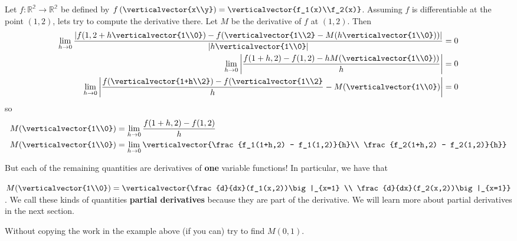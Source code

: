 \documentclass{ximera}
\begin{document}
\begin{example}
	Let $f:\mathbb{R^2} \to \mathbb{R^2}$ be defined by $f\left(\verticalvector{x\\y}\right) = \verticalvector{f_1(x)\\f_2(x)}$. 
	 Assuming $f$ is differentiable at the point $(1,2)$, lets try to compute the derivative there. 
	 Let $M$ be the derivative of $f$ at $(1,2)$.  Then 
	 \begin{align*}\displaystyle\lim_{h \to 0} \frac{\left|f(1,2+h\verticalvector{1\\0}) - f(\verticalvector{1\\2} - M(h\verticalvector{1\\0}))\right|}{\left|h\verticalvector{1\\0}\right|} &= 0\\
	  \displaystyle\lim_{h \to 0}\left| \frac{f(1+h,2) - f(1,2) - hM(\verticalvector{1\\0}))}{h} \right| &= 0\\
	  \displaystyle\lim_{h \to 0}\left| \frac{f(\verticalvector{1+h\\2}) - f(\verticalvector{1\\2}}{h} -M(\verticalvector{1\\0})\right| &= 0
	  \end{align*}
	  so
	  \begin{align*}
	  M(\verticalvector{1\\0}) &= \displaystyle\lim_{ h \to 0 } \frac{f(1+h,2) - f(1,2)}{h}\\
	  M(\verticalvector{1\\0}) &= \displaystyle\lim_{ h \to 0 } \verticalvector{\frac{f_1(1+h,2) - f_1(1,2)}{h}\\ \frac{f_2(1+h,2) - f_2(1,2)}{h}}
	 \end{align*}
	 
	 But each of the remaining quantities are derivatives of \textbf{one} variable functions!  In particular, we have that
	 
	 $M(\verticalvector{1\\0}) = \verticalvector{\frac{d}{dx}(f_1(x,2))\big|_{x=1} \\ \frac{d}{dx}(f_2(x,2))\big|_{x=1}}$.  
	 We call these kinds of quantities \textbf{partial derivatives}  because they are part of the derivative.  We will learn more about partial derivatives in the next section.
\end{example}

	Without copying the work in the example above (if you can) try to find $M(0,1)$.
	
\end{document}
